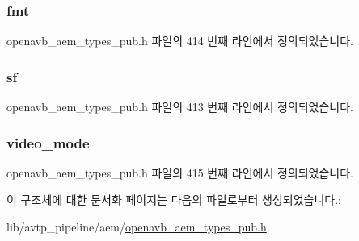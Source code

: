 \subsubsection[{\texorpdfstring{fmt}{fmt}}]{ fmt}\hypertarget{structopenavb__aem__stream__format__iec__61883__8__t_ab88030d1822b822615cede2168f1c31e}{}\label{structopenavb__aem__stream__format__iec__61883__8__t_ab88030d1822b822615cede2168f1c31e}


openavb\+\_\+aem\+\_\+types\+\_\+pub.\+h 파일의 414 번째 라인에서 정의되었습니다.

\subsubsection[{\texorpdfstring{sf}{sf}}]{ sf}\hypertarget{structopenavb__aem__stream__format__iec__61883__8__t_a153db177c2b7653917dff143e5f755e1}{}\label{structopenavb__aem__stream__format__iec__61883__8__t_a153db177c2b7653917dff143e5f755e1}


openavb\+\_\+aem\+\_\+types\+\_\+pub.\+h 파일의 413 번째 라인에서 정의되었습니다.

\subsubsection[{\texorpdfstring{video\+\_\+mode}{video_mode}}]{ video\+\_\+mode}\hypertarget{structopenavb__aem__stream__format__iec__61883__8__t_a0668258a00d1fdc63063142073b348f0}{}\label{structopenavb__aem__stream__format__iec__61883__8__t_a0668258a00d1fdc63063142073b348f0}


openavb\+\_\+aem\+\_\+types\+\_\+pub.\+h 파일의 415 번째 라인에서 정의되었습니다.



이 구조체에 대한 문서화 페이지는 다음의 파일로부터 생성되었습니다.\+:\begin{DoxyCompactItemize}
\item 
lib/avtp\+\_\+pipeline/aem/\hyperlink{openavb__aem__types__pub_8h}{openavb\+\_\+aem\+\_\+types\+\_\+pub.\+h}\end{DoxyCompactItemize}
